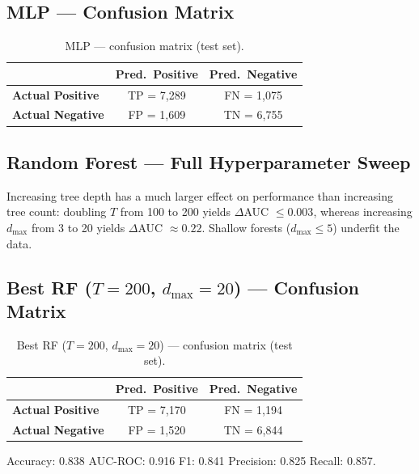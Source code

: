 \documentclass[letterpaper]{article} %
\begin{document}
\subsection*{MLP --- Confusion Matrix}
\begin{table}[h]
\centering
\caption{MLP --- confusion matrix (test set).}
\label{tab:mlp_cm}
\begin{tabular}{lcc}
\toprule
 & \textbf{Pred.\ Positive} & \textbf{Pred.\ Negative} \\
\midrule
\textbf{Actual Positive} & TP = 7,289 & FN = 1,075 \\
\textbf{Actual Negative} & FP = 1,609 & TN = 6,755 \\
\bottomrule
\end{tabular}
\end{table}

\subsection*{Random Forest --- Full Hyperparameter Sweep}
\begin{table}[h]
\centering
\caption{Random Forest AUC-ROC / F1 across all hyperparameter settings.}
\label{tab:rf_sweep}
\end{table}

Increasing tree depth has a much larger effect on performance than increasing tree count: doubling $T$ from 100 to 200 yields $\Delta$AUC $\leq 0.003$, whereas increasing $d_{\max}$ from 3 to 20 yields $\Delta$AUC $\approx 0.22$.  Shallow forests ($d_{\max} \leq 5$) underfit the data.

\subsection*{Best RF ($T=200$, $d_{\max}=20$) --- Confusion Matrix}
\begin{table}[h]
\centering
\caption{Best RF ($T=200$, $d_{\max}=20$) --- confusion matrix (test set).}
\label{tab:rf_best_cm}
\begin{tabular}{lcc}
\toprule
 & \textbf{Pred.\ Positive} & \textbf{Pred.\ Negative} \\
\midrule
\textbf{Actual Positive} & TP = 7,170 & FN = 1,194 \\
\textbf{Actual Negative} & FP = 1,520 & TN = 6,844 \\
\bottomrule
\end{tabular}
\end{table}
Accuracy: 0.838 \quad AUC-ROC: 0.916 \quad F1: 0.841 \quad Precision: 0.825 \quad Recall: 0.857.
\end{document}
